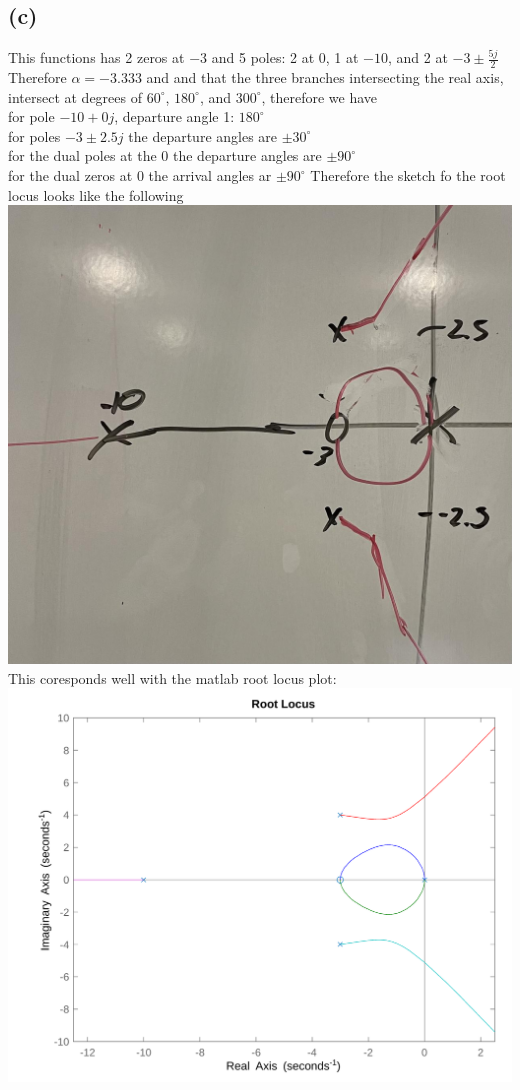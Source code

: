 \documentclass[12pt]{article}
\begin{document}
\subsection*{(c)}
This functions has 2 zeros at $-3$ and 5 poles: 2 at $0$, 1 at $-10$, and 2 at $-3\pm\frac{5j}{2}$
Therefore $\alpha=-3.333$ and and that the three branches intersecting the real axis, intersect at degrees of
$60^{\circ}$, $180^{\circ}$, and $300^{\circ}$,
therefore we have
\\for pole $-10+0j$, departure angle 1: $180^{\circ}$
\\for poles $-3\pm2.5j$ the departure angles are $\pm30^{\circ}$
\\for the dual poles at the $0$ the departure angles are $\pm90^{\circ}$
\\for the dual zeros at $0$ the arrival angles ar $\pm90^{\circ}$
Therefore the sketch fo the root locus looks like the following
\\
\includegraphics[scale=.15]{Problem2Sketch1.jpg}
\\This coresponds well with the matlab root locus plot:\\
\includegraphics[scale=.2]{Problem2Matlab1.png}
\end{document}

